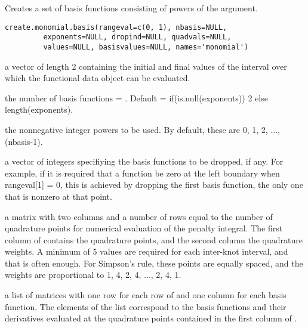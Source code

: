 \begin{Description}\relax
Creates a set of basis functions consisting of powers
of the argument.
\end{Description}
\begin{Usage}
\begin{verbatim}
create.monomial.basis(rangeval=c(0, 1), nbasis=NULL,
         exponents=NULL, dropind=NULL, quadvals=NULL,
         values=NULL, basisvalues=NULL, names='monomial')
\end{verbatim}
\end{Usage}
\begin{Arguments}
\begin{ldescription}
\item[\code{rangeval}] a vector of length 2 containing the initial and final
values of the interval over which the functional
data object can be evaluated.

\item[\code{nbasis}] the number of basis functions = .  Default =
if(is.null(exponents)) 2 else length(exponents).

\item[\code{exponents}] the nonnegative integer powers to be used.  By default,
these are 0, 1, 2, ..., (nbasis-1).

\item[\code{dropind}] a vector of integers specifiying the basis functions to be dropped,
if any.  For example, if it is required that a function be zero at
the left boundary when rangeval[1] = 0, this is achieved by dropping
the first basis function, the only one that is nonzero at that
point.

\item[\code{quadvals}] a matrix with two columns and a number of rows equal to the number
of quadrature points for numerical evaluation of the penalty
integral.  The first column of  contains the
quadrature points, and the second column the quadrature weights.  A
minimum of 5 values are required for each inter-knot interval, and
that is often enough.  For Simpson's rule, these points are equally
spaced, and the weights are proportional to 1, 4, 2, 4, ..., 2, 4,
1.

\item[\code{values}] a list of matrices with one row for each row of  and
one column for each basis function.  The elements of the list
correspond to the basis functions and their derivatives evaluated at
the quadrature points contained in the first column of
.


\end{ldescription}
\end{Arguments}
